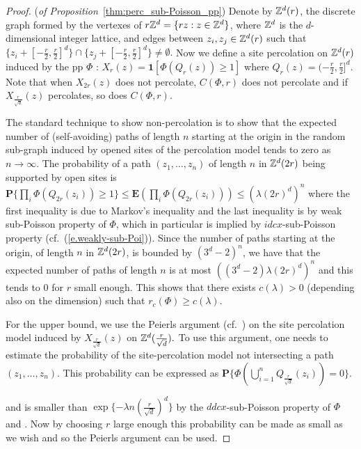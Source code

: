 \documentclass[conference]{IEEEtran}
\begin{document}
\begin{proof}({\em of Proposition}~\ref{thm:perc_sub-Poisson_pp})
Denote by ${\Bbb{Z}}^d(r)$, the discrete graph formed by the vertexes of
$r{\Bbb{Z}}^d=\{r z:z\in {\Bbb{Z}}^d\}$, where ${\Bbb{Z}}^d$ is the  $d$-dimensional
integer lattice,  
and edges between $z_i,z_j\in{\Bbb{Z}}^d(r)$ such that $\{z_i + 
[-\frac{r}{2},\frac{r}{2}]^d\} \cap \{z_j +
[-\frac{r}{2},\frac{r}{2}]^d\} \neq \emptyset.$ Now we define a site
percolation on ${\Bbb{Z}}^d(r)$ induced by the pp $\Phi$ : $X_r(z) =
\mathbf{1} [\Phi(Q_r(z)) \geq 1]$ where $Q_r(z) = 
(-\frac{r}{2},\frac{r}{2}]^d.$ Note that when $X_{2r}(z)$ does not 
  percolate, $C(\Phi,r)$ does not percolate and if
  $X_{\frac{r}{\sqrt{d}}}(z)$ percolates, so does $C(\Phi,r)$.    

The standard technique to show non-percolation is to show that the
expected number of (self-avoiding) paths of length $n$ starting at the
origin in the random sub-graph induced
by  opened sites of the percolation model tends to zero as $n\to\infty$.
The probability of a  path
$(z_1,\ldots,z_n)$ of length $n$ in ${\Bbb{Z}}^d(2r)$ being supported by 
open sites
is  ${{\mathbf P}}\{\prod_i \Phi(Q_{2r}(z_i)) \geq 1\} \leq 
{{\mathbf E}}(\prod_i \Phi(Q_{2r}(z_i))) \leq ({\lambda} (2r)^d)^n$ where the first inequality is
due to Markov's inequality and the last inequality is by weak
sub-Poisson property of $\Phi$, which in particular is  
implied by  $idcx$-sub-Poisson property
(cf.~(\ref{e.weakly-sub-Poi})).
Since the number of paths starting at the origin, of length
$n$ in ${\Bbb{Z}}^d(2r)$, is bounded by 
$(3^d-2)^n$, we have that the expected number of
paths of length $n$ is at most  $((3^d-2){\lambda} (2r)^d)^n$ 
and this tends to $0$ for $r$ small enough. 
This shows that there exists $c({\lambda}) > 0$ (depending also on the
dimension)  such
that $r_c(\Phi) \geq c({\lambda})$. 

For the upper bound, we use the Peierls argument (cf.~\cite[
  pp.~17--18]{Gr99}) on the site percolation model induced by
$X_{\frac{r}{\sqrt{d}}}(z)$ on ${\Bbb{Z}}^d(\frac{r}{\sqrt{d}}).$ To use
this argument, one needs to estimate the probability of the
site-percolation model not intersecting a path
$(z_1,\ldots,z_n)$. This probability can be expressed as 
${{\mathbf P}}\{\Phi(\bigcup_{i=1}^n Q_{\frac{r}{\sqrt{d}}}(z_i)) = 0\}$.

 
and is smaller than $\exp\{- {\lambda} n (\frac{r}{\sqrt{d}})^d\}$
by the $ddcx$-sub-Poisson property of $\Phi$ and
\cite[Proposition~4.1]{snorder}. Now by choosing $r$ large enough this
probability can 
be made as small as we wish and so the Peierls argument can be used.  
\end{proof}
\end{document}
